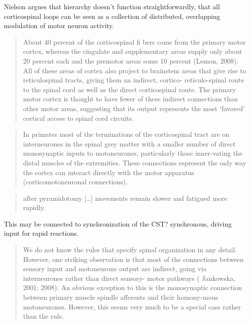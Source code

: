 Nielson argues that hierarchy doesn't function straightforwardly, that
all corticospinal loops can be seen as a collection of distributed,
overlapping modulation of motor neuron activity.

\begin{quote}
About 40 percent of the corticospinal fi bers come from the primary
motor cortex, whereas the cingulate and supplementary areas supply only
about 20 percent each and the premotor areas some 10 percent (Lemon,
2008). All of these areas of cortex also project to brainstem areas that
give rise to reticulospinal tracts, giving them an indirect, cortico-
reticulo-spinal route to the spinal cord as well as the direct
corticospinal route. The primary motor cortex is thought to have fewer
of these indirect connections than other motor areas, suggesting that
its output represents the most `favored' cortical access to spinal cord
circuits.
\end{quote}

\begin{quote}
In primates most of the terminations of the corticospinal tract are on
interneurones in the spinal grey matter with a smaller number of direct
monosynaptic inputs to motoneurones, particularly those inner-vating the
distal muscles of the extremities. These connections represent the only
way the cortex can interact directly with the motor apparatus
(corticomotoneuronal connections).
\end{quote}

\begin{quote}
after pyramidotomy {[}\ldots{]} movements remain slower and fatigued
more rapidly.
\end{quote}

This may be connected to synchronization of the CST? synchronous,
driving input for rapid reactions.

\begin{quote}
We do not know the rules that specify spinal organization in any detail.
However, one striking observation is that most of the connections
between sensory input and motoneurone output are indirect, going via
interneurones rather than direct sensory- motor pathways ( Jankowska,
2001; 2008). An obvious exception to this is the monosynaptic connection
between primary muscle spindle afferents and their homony-mous
motoneurones. However, this seems very much to be a special case rather
than the rule.
\end{quote}

